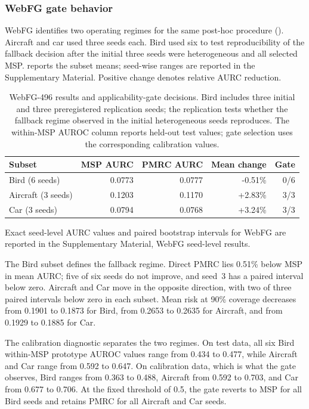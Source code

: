 \documentclass[review,times]{elsarticle}
\newcommand{\method}{PMRC}
\begin{document}
\subsubsection{WebFG gate behavior}

WebFG identifies two operating regimes for the same post-hoc procedure (). Aircraft and car used three seeds each. Bird used six to test reproducibility of the fallback decision after the initial three seeds were heterogeneous and all selected MSP.  reports the subset means; seed-wise ranges are reported in the Supplementary Material. Positive change denotes relative AURC reduction.

\begin{table}[t]
\centering
\caption{WebFG-496 results and applicability-gate decisions. Bird includes three initial and three preregistered replication seeds; the replication tests whether the fallback regime observed in the initial heterogeneous seeds reproduces. The within-MSP AUROC column reports held-out test values; gate selection uses the corresponding calibration values.}
\label{tab:webfg}
\fontsize{10}{12}\selectfont
\setlength{\tabcolsep}{4pt}
\begin{tabular}{@{}lrrrr@{}}
\toprule
Subset & MSP AURC & \method{} AURC & Mean change & Gate \\
\midrule
Bird (6 seeds) & 0.0773 & 0.0777 & -0.51\% & 0/6 \\
Aircraft (3 seeds) & 0.1203 & 0.1170 & +2.83\% & 3/3 \\
Car (3 seeds) & 0.0794 & 0.0768 & +3.24\% & 3/3 \\
\bottomrule
\end{tabular}
\end{table}

Exact seed-level AURC values and paired bootstrap intervals for WebFG are reported in the Supplementary Material, WebFG seed-level results.

The Bird subset defines the fallback regime. Direct PMRC lies 0.51\% below MSP in mean AURC; five of six seeds do not improve, and seed~3 has a paired interval below zero. Aircraft and Car move in the opposite direction, with two of three paired intervals below zero in each subset. Mean risk at 90\% coverage decreases from 0.1901 to 0.1873 for Bird, from 0.2653 to 0.2635 for Aircraft, and from 0.1929 to 0.1885 for Car.

The calibration diagnostic separates the two regimes. On test data, all six Bird within-MSP prototype AUROC values range from 0.434 to 0.477, while Aircraft and Car range from 0.592 to 0.647. On calibration data, which is what the gate observes, Bird ranges from 0.363 to 0.488, Aircraft from 0.592 to 0.703, and Car from 0.677 to 0.706. At the fixed threshold of 0.5, the gate reverts to MSP for all Bird seeds and retains \method{} for all Aircraft and Car seeds.
\end{document}
